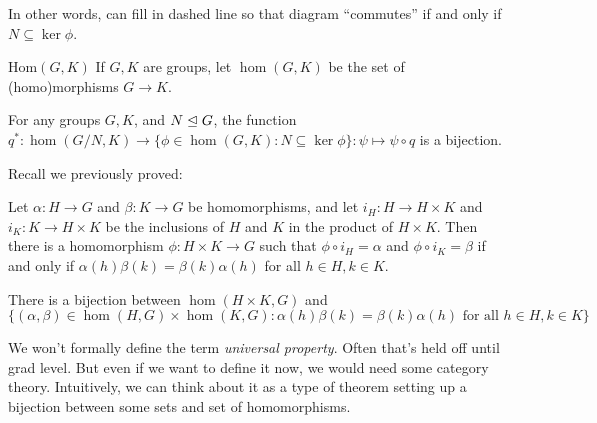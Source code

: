 In other words, can fill in dashed line so that diagram ``commutes'' if and only if $N\subseteq \ker \phi$.

\begin{defn}{Hom$(G,K)$}
If $G,K$ are groups, let \textbf{$\hom(G,K)$} be the set of (homo)morphisms $G\to K$.
\end{defn}

\begin{corr}
For any groups $G,K$, and $N\trianglelefteq G$, the function $q^*:\hom(G/N,K)\to \{\phi\in\hom (G,K):N\subseteq \ker \phi\}:\psi\mapsto \psi\circ q$ is a bijection.
\end{corr}

Recall we previously proved:
\begin{thm}
Let $\alpha:H\to G$ and $\beta:K\to G$ be homomorphisms, and let $i_H:H\to H\times K$ and $i_K:K\to H\times K$ be the inclusions of $H$ and $K$ in the product of $H\times K$. Then there is a homomorphism $\phi:H\times K\to G$ such that $\phi\circ i_H=\alpha$ and $\phi\circ i_K=\beta $ if and only if $\alpha(h)\beta(k)=\beta(k)\alpha(h)$ for all $h\in H, k\in K$.
\end{thm}

\begin{center}
\end{center}

\begin{corr}
There is a bijection between $\hom(H\times K,G)$ and $$\{(\alpha,\beta)\in \hom(H,G)\times \hom(K,G):\alpha(h)\beta(k)=\beta(k)\alpha(h) \text{ for all }h\in H,k\in K \}$$
\end{corr}

\begin{remark}
We won't formally define the term \textit{universal property}. Often that's held off until grad level. But even if we want to define it now, we would need some category theory. Intuitively, we can think about it as a type of theorem setting up a bijection between some sets and set of homomorphisms.
\end{remark}


